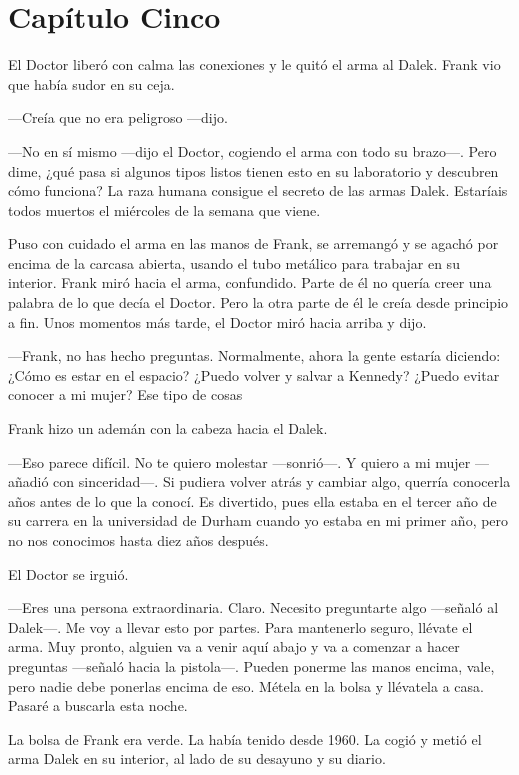 \chapter*{Capítulo Cinco}

El Doctor liberó con calma las conexiones y le quitó el arma al Dalek.
Frank vio que había sudor en su ceja.

---Creía que no era peligroso ---dijo.

---No en sí mismo ---dijo el Doctor, cogiendo el arma con todo su brazo---.
Pero dime, ¿qué pasa si algunos tipos listos tienen esto en su
laboratorio y descubren cómo funciona? La raza humana consigue el
secreto de las armas Dalek. Estaríais todos muertos el miércoles de la
semana que viene.

Puso con cuidado el arma en las manos de Frank, se arremangó y se agachó
por encima de la carcasa abierta, usando el tubo metálico para trabajar
en su interior. Frank miró hacia el arma, confundido. Parte de él no
quería creer una palabra de lo que decía el Doctor. Pero la otra parte
de él le creía desde principio a fin. Unos momentos más tarde, el Doctor
miró hacia arriba y dijo.

---Frank, no has hecho preguntas. Normalmente, ahora la gente estaría
diciendo: ¿Cómo es estar en el espacio? ¿Puedo volver y salvar a
Kennedy? ¿Puedo evitar conocer a mi mujer? Ese tipo de cosas

Frank hizo un ademán con la cabeza hacia el Dalek.

---Eso parece difícil. No te quiero molestar ---sonrió---. Y quiero a mi
mujer ---añadió con sinceridad---. Si pudiera volver atrás y cambiar algo,
querría conocerla años antes de lo que la conocí. Es divertido, pues
ella estaba en el tercer año de su carrera en la universidad de Durham
cuando yo estaba en mi primer año, pero no nos conocimos hasta diez años
después.

El Doctor se irguió.

---Eres una persona extraordinaria. Claro. Necesito preguntarte algo
---señaló al Dalek---. Me voy a llevar esto por partes. Para mantenerlo
seguro, llévate el arma. Muy pronto, alguien va a venir aquí abajo y va
a comenzar a hacer preguntas ---señaló hacia la pistola---. Pueden ponerme
las manos encima, vale, pero nadie debe ponerlas encima de eso. Métela
en la bolsa y llévatela a casa. Pasaré a buscarla esta noche.

La bolsa de Frank era verde. La había tenido desde 1960. La cogió y
metió el arma Dalek en su interior, al lado de su desayuno y su diario.

